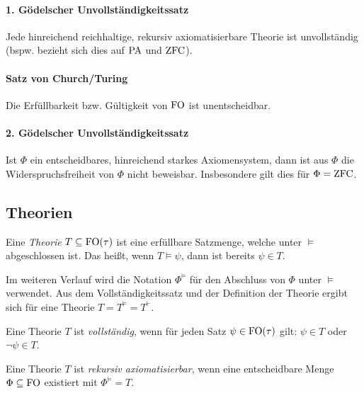 \paragraph*{1. Gödelscher Unvollständigkeitssatz}
Jede hinreichend reichhaltige, rekursiv axiomatisierbare Theorie ist unvollständig (bspw. bezieht sich dies auf $\operatorname{PA}$ und $\operatorname{ZFC}$).

\paragraph*{Satz von Church/Turing}
Die Erfüllbarkeit bzw. Gültigkeit von $\operatorname{FO}$ ist unentscheidbar.

\paragraph*{2. Gödelscher Unvollständigkeitssatz}
Ist $\Phi$ ein entscheidbares, hinreichend starkes Axiomensystem, dann ist aus $\Phi$ die Widerspruchsfreiheit von $\Phi$ nicht beweisbar. Insbesondere gilt dies für $\Phi=\operatorname{ZFC}$.

\subsection{Theorien}

\begin{definition}[Theorie]
	Eine \textit{Theorie} $T\subseteq \operatorname{FO}(\tau)$ ist eine erfüllbare Satzmenge, welche unter $\models$ abgeschlossen ist. Das heißt, wenn $T\models \psi$, dann ist bereits $\psi\in T$.
\end{definition}

Im weiteren Verlauf wird die Notation $\Phi^{\models}$ für den Abschluss von $\Phi$ unter $\models$ verwendet. 
Aus dem Vollständigkeitssatz und der Definition der Theorie ergibt sich für eine Theorie $T=T^{\models}=T^\vdash$.

\begin{definition}[Vollständigkeit]
	Eine Theorie $T$ ist \textit{vollständig}, wenn für jeden Satz $\psi\in \operatorname{FO}(\tau)$ gilt: $\psi\in T$ oder $\neg\psi\in T$.
\end{definition}

\begin{definition}
	Eine Theorie $T$ ist \textit{rekursiv axiomatisierbar}, wenn eine entscheidbare Menge 
	$\Phi\subseteq \operatorname{FO}$ existiert 
	mit $\Phi^{\models}=T$.
\end{definition}

